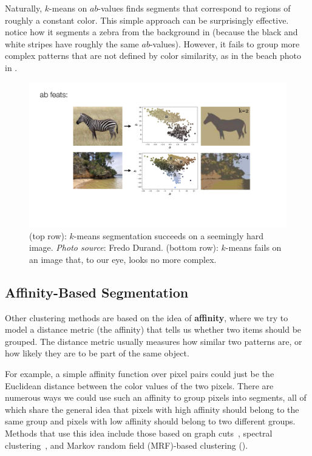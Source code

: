 Naturally, $k$-means on $ab$-values finds segments that correspond to regions of roughly a constant color. This simple approach can be surprisingly effective. notice how it segments a zebra from the background in \fig{\ref{fig:perceptual_organization:kmeans_ab_zebra_and_beach}} (because the black and white stripes have roughly the same $ab$-values). However, it fails to group more complex patterns that are not defined by color similarity, as in the beach photo in \fig{\ref{fig:perceptual_organization:kmeans_ab_zebra_and_beach}}.
\begin{figure}[h!]
    \centerline{
    \includegraphics[width=1.0\linewidth]{./figures/perceptual_organization/kmeans_ab_zebra_and_beach.pdf}
    }
    \caption{(top row): $k$-means segmentation succeeds on a seemingly hard image. \textit{Photo source}: Fredo Durand. (bottom row): $k$-means fails on an image that, to our eye, looks no more complex.}
    \label{fig:perceptual_organization:kmeans_ab_zebra_and_beach}
\end{figure}
\vspace{-0.4cm}

\subsection{Affinity-Based Segmentation}\label{sec:perceptual_organization:affinity_based_segmentation}
Other clustering methods are based on the idea of \textbf{affinity}, where we try to model a distance metric (the affinity) that tells us whether two items should be grouped. The distance metric usually measures how similar two patterns are, or how likely they are to be part of the same object.

For example, a simple affinity function over pixel pairs could just be the Euclidean distance between the color values of the two pixels. There are numerous ways we could use such an affinity to group pixels into segments, all of which share the general idea that pixels with high affinity should belong to the same group and pixels with low affinity should belong to two different groups. Methods that use this idea include those based on graph cuts~\cite{shi2000normalized}, spectral clustering~\cite{arbelaez2010contour}, and Markov random field (MRF)-based clustering (\chap{\ref{chapter:probabilistic_graphical_models}}).

